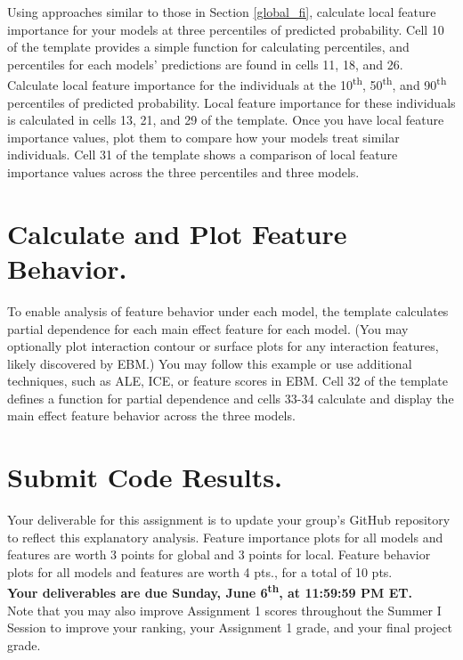 \documentclass[fleqn]{article}
\begin{document}
Using approaches similar to those in Section \ref{global_fi}, calculate local feature importance for your models at three percentiles of predicted probability. Cell 10 of the template provides a simple function for calculating percentiles, and percentiles for each models' predictions are found in cells 11, 18, and 26.\\

\noindent Calculate local feature importance for the individuals at the 10\textsuperscript{th}, 50\textsuperscript{th}, and 90\textsuperscript{th} percentiles of predicted probability. Local feature importance for these individuals is calculated in cells 13, 21, and 29 of the template. Once you have local feature importance values, plot them to compare how your models treat similar individuals. Cell 31 of the template shows a comparison of local feature importance values across the three percentiles and three models.

\section{Calculate and Plot Feature Behavior.}

To enable analysis of feature behavior under each model, the template calculates partial dependence for each main effect feature for each model. (You may optionally plot interaction contour or surface plots for any interaction features, likely discovered by EBM.) You may follow this example or use additional techniques, such as ALE, ICE, or feature scores in EBM. Cell 32 of the template defines a function for partial dependence and cells 33-34 calculate and display the main effect feature behavior across the three models. 

\section{Submit Code Results.}

Your deliverable for this assignment is to update your group's GitHub repository to reflect this explanatory analysis. Feature importance plots for all models and features are worth 3 points for global and 3 points for local. Feature behavior plots for all models and features are worth 4 pts., for a total of 10 pts.\\

\noindent \textbf{Your deliverables are due Sunday, June 6\textsuperscript{th}, at 11:59:59 PM ET.}\\

\noindent Note that you may also improve Assignment 1 scores throughout the Summer I Session to improve your ranking, your Assignment 1 grade, and your final project grade.
\end{document}
